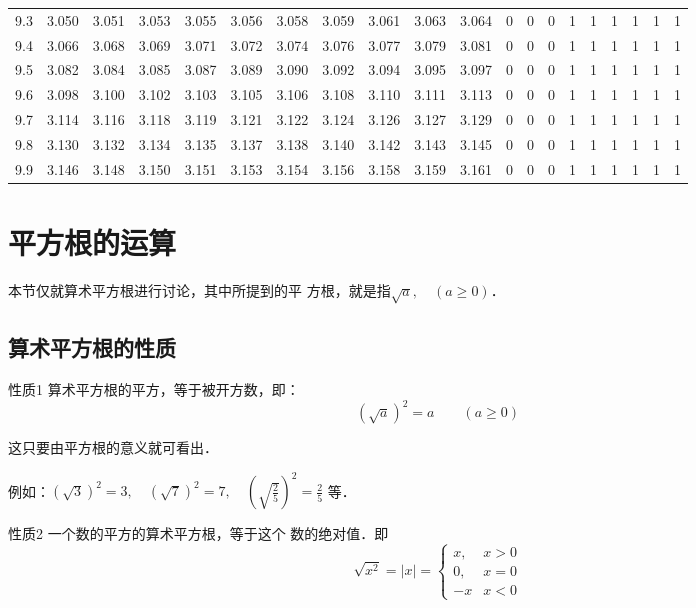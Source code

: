 \begin{table}[H]
{\begin{tabular}{|c|c|c|c|c|c|c|c|c|c|c|c|c|c|c|c|c|c|c|c|}
        9.3 & 3.050 & 3.051 & 3.053 & 3.055 & 3.056 & 3.058 & 3.059 & 3.061 & 3.063 & 3.064 & 0 & 0 & 0 & 1 & 1 & 1 & 1 & 1 & 1 \\
        9.4 & 3.066 & 3.068 & 3.069 & 3.071 & 3.072 & 3.074 & 3.076 & 3.077 & 3.079 & 3.081 & 0 & 0 & 0 & 1 & 1 & 1 & 1 & 1 & 1 \\
        9.5 & 3.082 & 3.084 & 3.085 & 3.087 & 3.089 & 3.090 & 3.092 & 3.094 & 3.095 & 3.097 & 0 & 0 & 0 & 1 & 1 & 1 & 1 & 1 & 1 \\
        9.6 & 3.098 & 3.100 & 3.102 & 3.103 & 3.105 & 3.106 & 3.108 & 3.110 & 3.111 & 3.113 & 0 & 0 & 0 & 1 & 1 & 1 & 1 & 1 & 1 \\
        9.7 & 3.114 & 3.116 & 3.118 & 3.119 & 3.121 & 3.122 & 3.124 & 3.126 & 3.127 & 3.129 & 0 & 0 & 0 & 1 & 1 & 1 & 1 & 1 & 1 \\
        9.8 & 3.130 & 3.132 & 3.134 & 3.135 & 3.137 & 3.138 & 3.140 & 3.142 & 3.143 & 3.145 & 0 & 0 & 0 & 1 & 1 & 1 & 1 & 1 & 1 \\
        9.9 & 3.146 & 3.148 & 3.150 & 3.151 & 3.153 & 3.154 & 3.156 & 3.158 & 3.159 & 3.161 & 0 & 0 & 0 & 1 & 1 & 1 & 1 & 1 & 1 \\
        \hline
    \end{tabular}%
    }
\end{table}

\section{平方根的运算}
本节仅就算术平方根进行讨论，其中所提到的平
方根，就是指$\sqrt{a},\quad (a\ge 0)$．

\subsection{算术平方根的性质}

\begin{blk}{性质1}
    算术平方根的平方，等于被开方数，即：
$$\left(\sqrt{a}\right)^2=a\qquad (a\ge 0)$$
\end{blk}

这只要由平方根的意义就可看出．

例如：$(\sqrt{3})^2=3,\quad (\sqrt{7})^2=7,\quad \left(\sqrt{\frac{2}{5}}\right)^2=\frac{2}{5}$
等．

\begin{blk}{性质2}
    一个数的平方的算术平方根，等于这个
数的绝对值．即
\[\sqrt{x^2}=|x|=\begin{cases}
    x,& x>0\\
    0, &x=0\\
    -x & x<0
\end{cases}\]
\end{blk}

